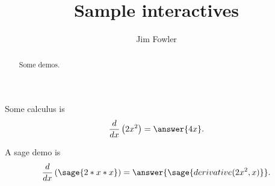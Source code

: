 \documentclass{ximera}
\title{Sample interactives}
\author{Jim Fowler}
\begin{document}
\begin{abstract}
Some demos.
\end{abstract}
\maketitle

\begin{problem}
  Some calculus is
  \[
    \frac{d}{dx} \left( 2x^2 \right) = \answer{4x}.
  \]
\end{problem}

\begin{problem}
  A sage demo is
  \[
    \frac{d}{dx} \left( \sage{2*x*x} \right) =
      \answer{\sage{derivative(2x^2,x)}}.
  \]
\end{problem}
\end{document}
